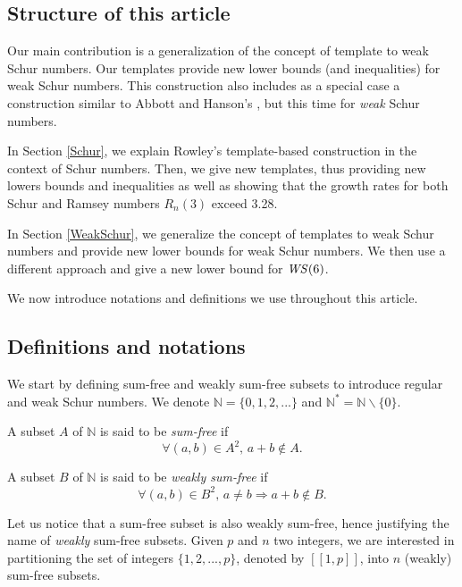 \subsection{Structure of this article}

\qquad Our main contribution is a generalization of the concept of template to weak Schur numbers. Our templates 
provide new lower bounds (and inequalities) for weak Schur numbers. This construction also includes as a special case 
a construction similar to Abbott and Hanson's \cite{AbbottHanson}, but this time for \textit{weak} Schur numbers.

\par
In Section \ref{Schur}, we explain Rowley's template-based construction in the context of 
Schur numbers. Then, we give new templates, thus providing new lowers bounds and inequalities as well as 
showing that the growth rates for both Schur and Ramsey numbers \(R_n(3)\) exceed 3.28. 

\par
In Section \ref{WeakSchur}, we generalize the concept of templates to weak Schur numbers 
and provide new lower bounds for weak Schur numbers. We then use a different approach and give a new 
lower bound for \(\mathit{WS}(6)\).

\par
We now introduce notations and definitions we use throughout this article.

\subsection{Definitions and notations}

\qquad We start by defining sum-free and weakly sum-free subsets to introduce regular and weak Schur numbers. 
We denote \(\mathbb{N} = \{0, 1, 2, ...\}\) and \(\mathbb{N}^* =\mathbb{N} \backslash \{0\}\).

\begin{definition}
A subset \(A\) of \(\mathbb{N}\) is said to be \textit{sum-free} if
\[ \forall (a,b) \in A^2 \text{, } a+b \notin A.\]
\end{definition}

\begin{definition}
A subset \(B\) of \(\mathbb{N}\) is said to be \textit{weakly sum-free} if
\[ \forall (a,b) \in B^2 \text{, } a \neq b \Longrightarrow a+b \notin B.\]
\end{definition}

Let us notice that a sum-free subset is also weakly sum-free, hence justifying the name of \textit{weakly} sum-free
subsets. Given \(p\) and \(n\) two integers, we are interested in partitioning the set of integers \(\{1, 2, ..., p\}\), 
denoted by \([\![1,p]\!]\), into \(n\) (weakly) sum-free subsets.

